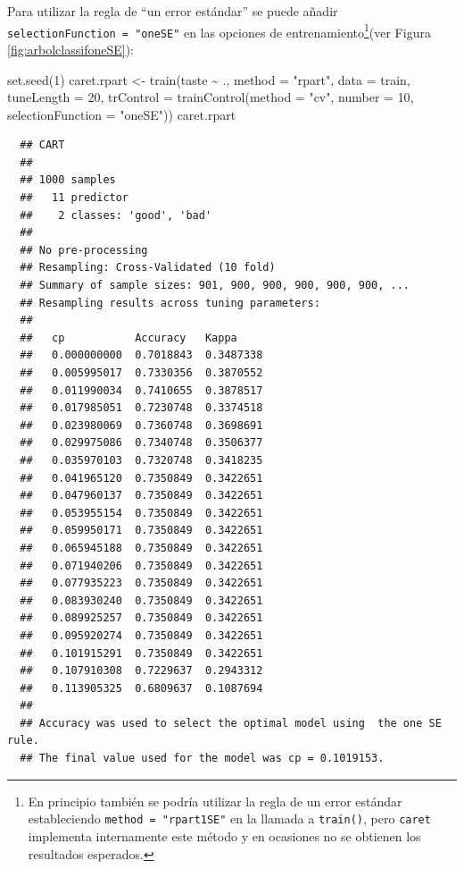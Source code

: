 \documentclass[
]{book}
\newenvironment{Shaded}{\begin{snugshade}}{\end{snugshade}}
\newcommand{\AttributeTok}[1]{\textcolor[rgb]{0.77,0.63,0.00}{#1}}
\newcommand{\DecValTok}[1]{\textcolor[rgb]{0.00,0.00,0.81}{#1}}
\newcommand{\FunctionTok}[1]{\textcolor[rgb]{0.00,0.00,0.00}{#1}}
\newcommand{\NormalTok}[1]{#1}
\newcommand{\OtherTok}[1]{\textcolor[rgb]{0.56,0.35,0.01}{#1}}
\newcommand{\SpecialCharTok}[1]{\textcolor[rgb]{0.00,0.00,0.00}{#1}}
\newcommand{\StringTok}[1]{\textcolor[rgb]{0.31,0.60,0.02}{#1}}
\theoremstyle{break}
\theoremstyle{nonumberplain}
\begin{document}
Para utilizar la regla de ``un error estándar'' se puede añadir \texttt{selectionFunction\ =\ "oneSE"} en las opciones de entrenamiento\footnote{En principio también se podría utilizar la regla de un error estándar estableciendo \texttt{method\ =\ "rpart1SE"} en la llamada a \texttt{train()}, pero \texttt{caret} implementa internamente este método y en ocasiones no se obtienen los resultados esperados.}(ver Figura \ref{fig:arbolclassifoneSE}):



\begin{Shaded}
\begin{Highlighting}[]
\FunctionTok{set.seed}\NormalTok{(}\DecValTok{1}\NormalTok{)}
\NormalTok{caret.rpart }\OtherTok{\textless{}{-}} \FunctionTok{train}\NormalTok{(taste }\SpecialCharTok{\textasciitilde{}}\NormalTok{ ., }\AttributeTok{method =} \StringTok{"rpart"}\NormalTok{, }\AttributeTok{data =}\NormalTok{ train, }\AttributeTok{tuneLength =} \DecValTok{20}\NormalTok{,}
                     \AttributeTok{trControl =} \FunctionTok{trainControl}\NormalTok{(}\AttributeTok{method =} \StringTok{"cv"}\NormalTok{, }\AttributeTok{number =} \DecValTok{10}\NormalTok{,}
                                              \AttributeTok{selectionFunction =} \StringTok{"oneSE"}\NormalTok{)) }
\NormalTok{caret.rpart}
\end{Highlighting}
\end{Shaded}

\begin{verbatim}
  ## CART 
  ## 
  ## 1000 samples
  ##   11 predictor
  ##    2 classes: 'good', 'bad' 
  ## 
  ## No pre-processing
  ## Resampling: Cross-Validated (10 fold) 
  ## Summary of sample sizes: 901, 900, 900, 900, 900, 900, ... 
  ## Resampling results across tuning parameters:
  ## 
  ##   cp           Accuracy   Kappa    
  ##   0.000000000  0.7018843  0.3487338
  ##   0.005995017  0.7330356  0.3870552
  ##   0.011990034  0.7410655  0.3878517
  ##   0.017985051  0.7230748  0.3374518
  ##   0.023980069  0.7360748  0.3698691
  ##   0.029975086  0.7340748  0.3506377
  ##   0.035970103  0.7320748  0.3418235
  ##   0.041965120  0.7350849  0.3422651
  ##   0.047960137  0.7350849  0.3422651
  ##   0.053955154  0.7350849  0.3422651
  ##   0.059950171  0.7350849  0.3422651
  ##   0.065945188  0.7350849  0.3422651
  ##   0.071940206  0.7350849  0.3422651
  ##   0.077935223  0.7350849  0.3422651
  ##   0.083930240  0.7350849  0.3422651
  ##   0.089925257  0.7350849  0.3422651
  ##   0.095920274  0.7350849  0.3422651
  ##   0.101915291  0.7350849  0.3422651
  ##   0.107910308  0.7229637  0.2943312
  ##   0.113905325  0.6809637  0.1087694
  ## 
  ## Accuracy was used to select the optimal model using  the one SE rule.
  ## The final value used for the model was cp = 0.1019153.
\end{verbatim}
\end{document}
